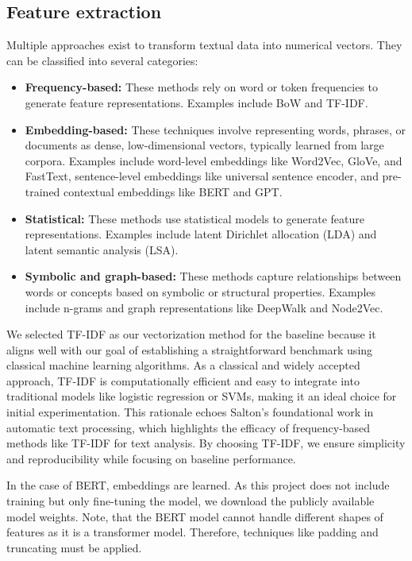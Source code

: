 \subsection{Feature extraction}
Multiple approaches exist to transform textual data into numerical vectors. They can be classified into several categories:

\begin{itemize}
    \item \textbf{Frequency-based:} These methods rely on word or token frequencies to generate feature representations. Examples include BoW and TF-IDF. \cite{Manning2008}
    \item \textbf{Embedding-based:} These techniques involve representing words, phrases, or documents as dense, low-dimensional vectors, typically learned from large corpora. Examples include word-level embeddings like Word2Vec, GloVe, and FastText, sentence-level embeddings like universal sentence encoder, and pre-trained contextual embeddings like BERT and GPT. \cite{Mikolov2013, Pennington2014, Bojanowski2017, Cer2018, Devlin2019, Radford2019}
    \item \textbf{Statistical:} These methods use statistical models to generate feature representations. Examples include latent Dirichlet allocation (LDA) and latent semantic analysis (LSA). \cite{Blei2003, Deerwester1990}
    \item \textbf{Symbolic and graph-based:} These methods capture relationships between words or concepts based on symbolic or structural properties. Examples include n-grams and graph representations like DeepWalk and Node2Vec. \cite{Perozzi2014, Grover2016}
\end{itemize}

We selected TF-IDF as our vectorization method for the baseline because it aligns well with our goal of establishing a straightforward benchmark using classical machine learning algorithms. As a classical and widely accepted approach, TF-IDF is computationally efficient and easy to integrate into traditional models like logistic regression or SVMs, making it an ideal choice for initial experimentation. This rationale echoes Salton’s foundational work in automatic text processing, which highlights the efficacy of frequency-based methods like TF-IDF for text analysis. By choosing TF-IDF, we ensure simplicity and reproducibility while focusing on baseline performance. \cite{Salton1989}

In the case of BERT, embeddings are learned. As this project does not include training but only fine-tuning the model, we download the publicly available model weights. Note, that the BERT model cannot handle different shapes of features as it is a transformer model. Therefore, techniques like padding and truncating must be applied.

